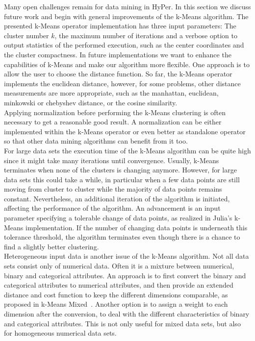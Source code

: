 Many open challenges remain for data mining in HyPer. In this section we discuss future work and begin with general improvements of the k-Means algorithm.
The presented k-Means operator implementation has three input parameters: The cluster number $k$, the maximum number of iterations and a verbose option to output statistics of the performed execution, such as the center coordinates and the cluster compactness. 
In future implementations we want to enhance the capabilities of k-Means and make our algorithm more flexible. 
One approach is to allow the user to choose the distance function. So far, the k-Means operator implements the euclidean distance, however, for some problems, other distance measurements are more appropriate, such as the manhattan, euclidean, minkowski or chebyshev distance, or the cosine similarity.
\\
Applying normalization before performing the k-Means clustering is often necessary to get a reasonable good result. A normalization can be either implemented within the k-Means operator or even better as standalone operator so that other data mining algorithms can benefit from it too.
\\
For large data sets the execution time of the k-Means algorithm can be quite high since it might take many iterations until convergence. Usually, k-Means terminates when none of the clusters is changing anymore. However, for large data sets this could take a while, in particular when a few data points are still moving from cluster to cluster while the majority of data points remains constant. Nevertheless, an additional iteration of the algorithm is initiated, affecting the performance of the algorithm. An advancement is an input parameter specifying a tolerable change of data points, as realized in Julia's k-Means implementation. If the number of changing data points is underneath this tolerance threshold, the algorithm terminates even though there is a chance to find a slightly better clustering.
\\
Heterogeneous input data is another issue of the k-Means algorithm. Not all data sets consist only of numerical data. Often it is a mixture between numerical, binary and categorical attributes. An approach is to first convert the binary and categorical attributes to numerical attributes, and then provide an extended distance and cost function to keep the different dimensions comparable, as proposed in k-Means Mixed~\parencite{ahmad2007kmean}. Another option is to assign a weight to each dimension after the conversion, to deal with the different characteristics of binary and categorical attributes. This is not only useful for mixed data sets, but also for homogeneous numerical data sets.
